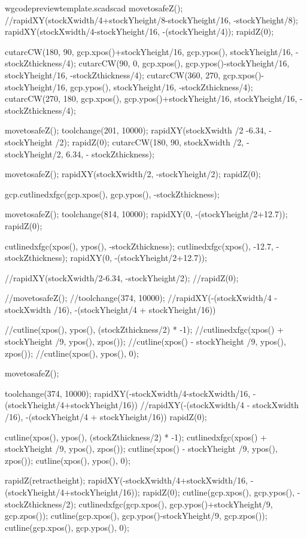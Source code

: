 \documentclass{ltxdoc}
\begin{document}
\begin{writecode}{w}{gcodepreviewtemplate.scad}{scad}
movetosafeZ();
//rapidXY(stockXwidth/4+stockYheight/8-stockYheight/16, -stockYheight/8);
rapidXY(stockXwidth/4-stockYheight/16, -(stockYheight/4));
rapidZ(0);

cutarcCW(180, 90, gcp.xpos()+stockYheight/16, gcp.ypos(), stockYheight/16, -stockZthickness/4);
cutarcCW(90, 0, gcp.xpos(), gcp.ypos()-stockYheight/16, stockYheight/16, -stockZthickness/4);
cutarcCW(360, 270, gcp.xpos()-stockYheight/16, gcp.ypos(), stockYheight/16, -stockZthickness/4);
cutarcCW(270, 180, gcp.xpos(), gcp.ypos()+stockYheight/16, stockYheight/16, -stockZthickness/4);

movetosafeZ();
toolchange(201, 10000);
rapidXY(stockXwidth /2 -6.34, - stockYheight /2);
rapidZ(0);
cutarcCW(180, 90, stockXwidth /2, -stockYheight/2, 6.34, - stockZthickness);

movetosafeZ();
rapidXY(stockXwidth/2, -stockYheight/2);
rapidZ(0);

gcp.cutlinedxfgc(gcp.xpos(), gcp.ypos(), -stockZthickness);

movetosafeZ();
toolchange(814, 10000);
rapidXY(0, -(stockYheight/2+12.7));
rapidZ(0);

cutlinedxfgc(xpos(), ypos(), -stockZthickness);
cutlinedxfgc(xpos(), -12.7, -stockZthickness);
rapidXY(0, -(stockYheight/2+12.7));

//rapidXY(stockXwidth/2-6.34, -stockYheight/2);
//rapidZ(0);

//movetosafeZ();
//toolchange(374, 10000);
//rapidXY(-(stockXwidth/4 - stockXwidth /16), -(stockYheight/4 + stockYheight/16))

//cutline(xpos(), ypos(), (stockZthickness/2) * -1);
//cutlinedxfgc(xpos() + stockYheight /9, ypos(), zpos());
//cutline(xpos() - stockYheight /9, ypos(), zpos());
//cutline(xpos(), ypos(), 0);

movetosafeZ();

toolchange(374, 10000);
rapidXY(-stockXwidth/4-stockXwidth/16, -(stockYheight/4+stockYheight/16))
//rapidXY(-(stockXwidth/4 - stockXwidth /16), -(stockYheight/4 + stockYheight/16))
rapidZ(0);

cutline(xpos(), ypos(), (stockZthickness/2) * -1);
cutlinedxfgc(xpos() + stockYheight /9, ypos(), zpos());
cutline(xpos() - stockYheight /9, ypos(), zpos());
cutline(xpos(), ypos(), 0);

rapidZ(retractheight);
rapidXY(-stockXwidth/4+stockXwidth/16, -(stockYheight/4+stockYheight/16));
rapidZ(0);
cutline(gcp.xpos(), gcp.ypos(), -stockZthickness/2);
cutlinedxfgc(gcp.xpos(), gcp.ypos()+stockYheight/9, gcp.zpos());
cutline(gcp.xpos(), gcp.ypos()-stockYheight/9, gcp.zpos());
cutline(gcp.xpos(), gcp.ypos(), 0);


\end{writecode}
\end{document}
